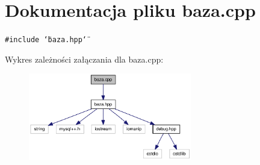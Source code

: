 \hypertarget{a00006}{
\section{Dokumentacja pliku baza.cpp}
\label{de/d21/a00006}
}
{\tt \#include \char`\"{}baza.hpp\char`\"{}}\par


Wykres zależności załączania dla baza.cpp:\nopagebreak
\begin{figure}[H]
\begin{center}
\leavevmode
\includegraphics[width=202pt]{db/df3/a00034}
\end{center}
\end{figure}
